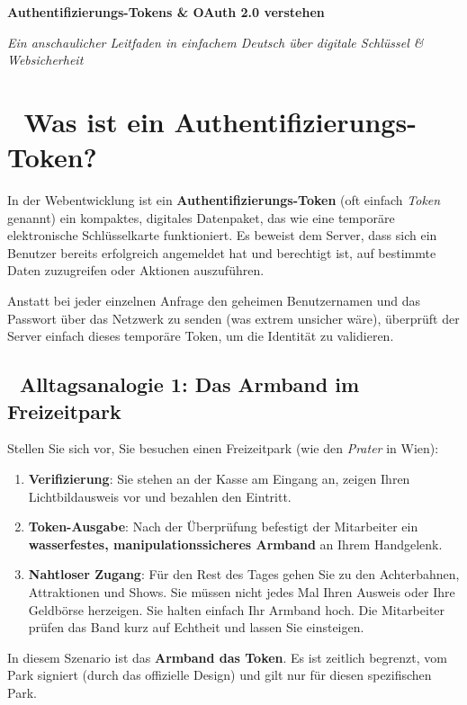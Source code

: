 \documentclass[11pt,a4paper]{article}
\begin{document}
\begin{tcolorbox}[
    colback=primaryblue,
    colframe=primaryblue,
    arc=6pt,
    left=15pt,
    right=15pt,
    top=20pt,
    bottom=20pt,
    coltext=white
]
    \centering
    {\huge\bfseries Authentifizierungs-Tokens \& OAuth 2.0 verstehen \par}
    \vspace{8pt}
    {\large\itshape Ein anschaulicher Leitfaden in einfachem Deutsch über digitale Schlüssel \& Websicherheit \par}
\end{tcolorbox}

\vspace{15pt}

\section{🔑 Was ist ein Authentifizierungs-Token?}
In der Webentwicklung ist ein \textbf{Authentifizierungs-Token} (oft einfach \textit{Token} genannt) ein kompaktes, digitales Datenpaket, das wie eine temporäre elektronische Schlüsselkarte funktioniert. Es beweist dem Server, dass sich ein Benutzer bereits erfolgreich angemeldet hat und berechtigt ist, auf bestimmte Daten zuzugreifen oder Aktionen auszuführen.

Anstatt bei jeder einzelnen Anfrage den geheimen Benutzernamen und das Passwort über das Netzwerk zu senden (was extrem unsicher wäre), überprüft der Server einfach dieses temporäre Token, um die Identität zu validieren.

\subsection{🚗 Alltagsanalogie 1: Das Armband im Freizeitpark}
Stellen Sie sich vor, Sie besuchen einen Freizeitpark (wie den \textit{Prater} in Wien):
\begin{enumerate}
    \item \textbf{Verifizierung}: Sie stehen an der Kasse am Eingang an, zeigen Ihren Lichtbildausweis vor und bezahlen den Eintritt.
    \item \textbf{Token-Ausgabe}: Nach der Überprüfung befestigt der Mitarbeiter ein \textbf{wasserfestes, manipulationssicheres Armband} an Ihrem Handgelenk.
    \item \textbf{Nahtloser Zugang}: Für den Rest des Tages gehen Sie zu den Achterbahnen, Attraktionen und Shows. Sie müssen nicht jedes Mal Ihren Ausweis oder Ihre Geldbörse herzeigen. Sie halten einfach Ihr Armband hoch. Die Mitarbeiter prüfen das Band kurz auf Echtheit und lassen Sie einsteigen.
\end{enumerate}
In diesem Szenario ist das \textbf{Armband das Token}. Es ist zeitlich begrenzt, vom Park signiert (durch das offizielle Design) und gilt nur für diesen spezifischen Park.
\end{document}
